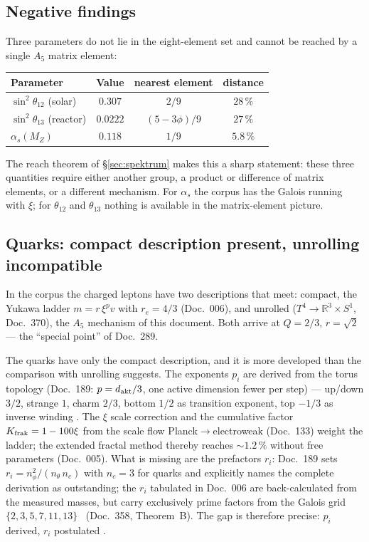 \subsection{Negative findings \XM}

Three parameters do not lie in the eight-element set and cannot be reached
by a single $A_5$ matrix element:
\begin{center}
\begin{tabular}{@{}lccc@{}}
\toprule
Parameter & Value & nearest element & distance \\
\midrule
$\sin^2\theta_{12}$ (solar) & $0.307$ & $2/9$ & $28\,\%$ \\
$\sin^2\theta_{13}$ (reactor) & $0.0222$ & $(5-3\phi)/9$ & $27\,\%$ \\
$\alpha_s(M_Z)$ & $0.118$ & $1/9$ & $5.8\,\%$ \\
\bottomrule
\end{tabular}
\end{center}
The reach theorem of §\ref{sec:spektrum} makes this a sharp statement: these
three quantities require either another group, a product or difference of
matrix elements, or a different mechanism. For $\alpha_s$ the corpus has the
Galois running with $\xi$; for $\theta_{12}$ and $\theta_{13}$ nothing is
available in the matrix-element picture.

\subsection{Quarks: compact description present, unrolling incompatible}
\label{sec:quarks}

In the corpus the charged leptons have two descriptions that meet: compact,
the Yukawa ladder $m = r\,\xi^p v$ with $r_e = 4/3$ (Doc.~006), and unrolled
($T^4\to\mathbb R^3\times S^1$, Doc.~370), the $A_5$ mechanism of this
document. Both arrive at $Q = 2/3$, $r = \sqrt2$ --- the ``special point''
of Doc.~289.

The quarks have only the compact description, and it is more developed than
the comparison with unrolling suggests. The exponents $p_i$ are derived from
the torus topology (Doc.~189: $p = d_{\rm akt}/3$, one active dimension fewer
per step) --- up/down $3/2$, strange $1$, charm $2/3$, bottom $1/2$ as
transition exponent, top $-1/3$ as inverse winding \KM. The $\xi$ scale
correction and the cumulative factor $K_{\rm frak} = 1-100\xi$ from the scale
flow Planck$\to$electroweak (Doc.~133) weight the ladder; the extended
fractal method thereby reaches $\sim1.2\,\%$ without free parameters
(Doc.~005). What is missing are the prefactors $r_i$: Doc.~189 sets
$r_i = n_\phi^2/(n_\theta\,n_c)$ with $n_c = 3$ for quarks and explicitly
names the complete derivation as outstanding; the $r_i$ tabulated in
Doc.~006 are back-calculated from the measured masses, but carry exclusively
prime factors from the Galois grid $\{2,3,5,7,11,13\}$ \BM~(Doc.~358,
Theorem~B). The gap is therefore precise: $p_i$ derived, $r_i$ postulated
\SM.

